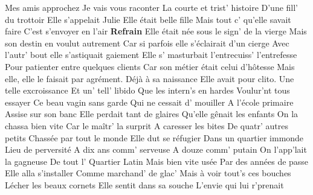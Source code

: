 \footnotemark 
[ititle={Julie}]


\beginverse
Mes amis approchez
Je vais vous raconter
La courte et trist' histoire
D'une fill' du trottoir
Elle s'appelait Julie
Elle était belle fille
Mais tout c' qu'elle savait faire
C'est s'envoyer en l'air
\endverse
\beginchorus
\textbf{Refrain}
Elle était née sous le sign' de la vierge
Mais son destin en voulut autrement
Car si parfois elle s'éclairait d'un cierge
Avec l'autr' bout elle s'astiquait gaiement
Elle s' masturbait l'entrecuiss' l'entrefesse
Pour patienter entre quelques clients
Car son métier était celui d'hôtesse
Mais elle, elle le faisait par agrément.
\endchorus
\beginverse
Déjà à sa naissance
Elle avait pour clito.
Une telle excroissance
Et un' tell' libido
Que les intern's en hardes
Voulur'nt tous essayer
Ce beau vagin sans garde
Qui ne cessait d' mouiller
\endverse
\beginverse
A l'école primaire
Assise sur son banc
Elle perdait tant de glaires
Qu'elle gênait les enfants
On la chassa bien vite
Car le maîtr' la surprit
A caresser les bites
De quatr' autres petits
\endverse
\beginverse
Chassée par tout le monde
Elle dut se réfugier
Dans un quartier immonde
Lieu de perversité
A dix ans comm' serveuse
A douze comm' putain
On l'app'lait la gagneuse
De tout l' Quartier Latin
\endverse
\beginverse
Mais bien vite usée
Par des années de passe
Elle alla s'installer
Comme marchand' de glac'
Mais à voir tout's ces bouches
Lécher les beaux cornets
Elle sentit dans sa souche
L'envie qui lui r'prenait
\endverse
\endsong

